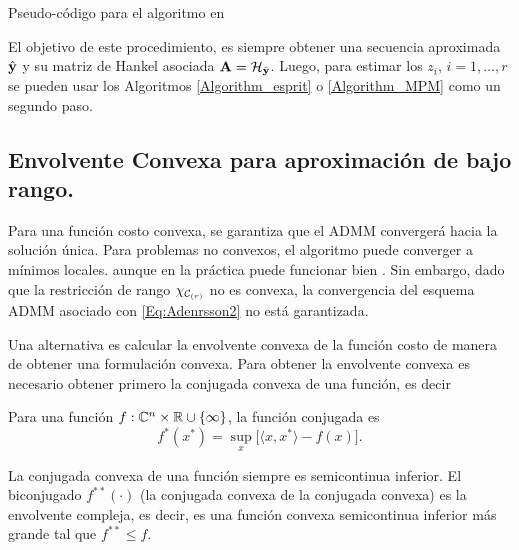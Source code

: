 		\begin{algorithm}
			\caption{Pseudo-código para el algoritmo en \cite{Andersson2014}}
			\begin{algorithmic}[1]
				\EndWhile	
			\end{algorithmic}
			\label{Algorithm_Andersson}
		\end{algorithm} 

		El objetivo de este procedimiento, es siempre obtener una secuencia aproximada $\hat{\mathbf{y}}$ y su matriz de Hankel asociada $\mathbf{A} = \mathcal{H}_{\hat{\mathbf{y}}}$. Luego, para estimar los $z_i$, $i=1,\ldots,r$ se pueden usar los Algoritmos \eqref{Algorithm_esprit} o \eqref{Algorithm_MPM} como un segundo paso.

        \subsection{Envolvente Convexa para aproximación de bajo rango.}
		Para una función costo convexa, se garantiza que el ADMM convergerá hacia la solución única. Para problemas no convexos, el algoritmo puede converger a mínimos locales. aunque en la práctica puede funcionar bien \cite{Boyd2011, Andersson2014}. Sin embargo, dado que la restricción de rango $\chi_{\mathcal{C}_{(r)}}$ no es convexa, la convergencia del esquema ADMM asociado con \eqref{Eq:Adenrsson2} no está garantizada.
		
  		
  		Una alternativa  es calcular la envolvente convexa de la función costo de manera de obtener una formulación convexa. Para obtener la envolvente convexa es necesario obtener primero la  conjugada convexa de una función, es decir
        \begin{definition}
            Para una función $f:\mathbb{C}^n\times\mathbb{R}\cup\{\infty\}$, la función conjugada es 
            \begin{equation}
                f^*(x^*) = \sup_{x}\big[\langle x,x^*\rangle - f(x)\big].
                \label{eq:convex}
            \end{equation}
        \end{definition}
        La conjugada convexa de una función siempre es semicontinua inferior. El biconjugado $f^{**}(\cdot)$ (la conjugada convexa de la conjugada convexa) es la envolvente compleja, es decir, es una función convexa semicontinua inferior más grande tal que $f^{**}\le f$. \cite{Boyd2011}
        
